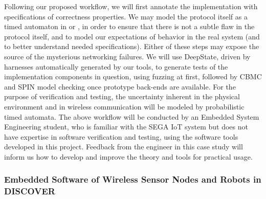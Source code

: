 Following our proposed workflow, we will first annotate the implementation with specifications of correctness properties.  We may model the protocol itself as a timed automaton in \uppaal or \prism, in order to ensure that there is not a subtle flaw in the protocol itself, and to model our expectations of behavior in the real system (and to better understand needed specifications).
Either of these steps may expose the source of the mysterious networking failures.
We will use DeepState, driven by harnesses automatically generated by our tools, to generate tests of the implementation components in question, using fuzzing at first, followed by CBMC and SPIN model checking once prototype back-ends are available.
For the purpose of verification and testing, the uncertainty inherent in the physical environment and in wireless communication will be modeled by probabilistic timed automata.
%
%
The above workflow will be conducted by an Embedded System Engineering student, who is familiar with the SEGA IoT system but does not have expertise in software verification and testing, using the software tools developed in this project.
Feedback from the engineer in this case study will inform us how to develop and improve the theory and tools for practical usage.


\subsubsection{Embedded Software of Wireless Sensor Nodes and Robots in DISCOVER}
\label{sec:case-study:DISCOVER}


